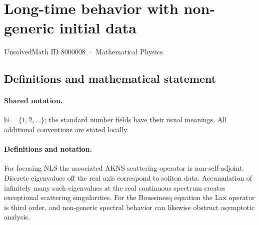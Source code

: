 \documentclass[11pt]{article}
\begin{document}
\setcounter{section}{8000007}
\section{Long-time behavior with non-generic initial data}\label{8000008}
{\small UnsolvedMath ID 8000008 · Mathematical Physics}
\subsection{Definitions and mathematical statement}

\paragraph{Shared notation.}$\mathbb N=\{1,2,\ldots\}$; the standard number fields have their usual meanings. All additional conventions are stated locally.


\paragraph{Definitions and notation.}For focusing NLS the associated AKNS scattering operator is non-self-adjoint. Discrete eigenvalues off the real axis correspond to soliton data. Accumulation of infinitely many such eigenvalues at the real continuous spectrum creates exceptional scattering singularities. For the Boussinesq equation the Lax operator is third order, and non-generic spectral behavior can likewise obstruct asymptotic analysis.
\end{document}
